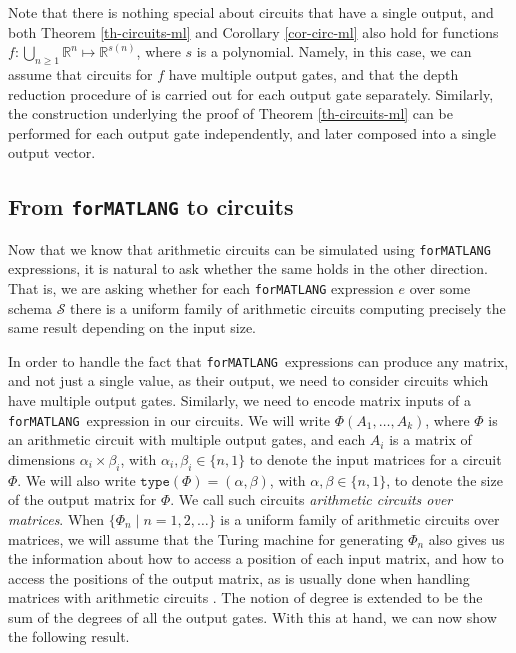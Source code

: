 \documentclass[sigconf]{acmart}
\newcommand{\Sch}{\mathcal{S}}
\newcommand{\langfor}{\texttt{for}\text{-}\texttt{MATLANG}\xspace}
\begin{document}
Note that there is nothing special about circuits that have a single output, and both Theorem \ref{th-circuits-ml} and Corollary \ref{cor-circ-ml} also hold for functions  $f:\bigcup_{n\geq 1} \mathbb{R}^n\mapsto\mathbb{R}^{s(n)}$, where $s$ is a polynomial. Namely, in this case, we can assume that circuits for $f$ have multiple output gates, and that the depth reduction procedure of \cite{AllenderJMV98} is carried out for each output gate separately. Similarly, the construction underlying the proof of Theorem \ref{th-circuits-ml} can be performed for each output gate independently, and later composed into a single output vector.

\subsection{From \langfor to circuits}

Now that we know that arithmetic circuits can be simulated using \langfor expressions, it is natural to ask whether the same holds in the other direction. That is, we are asking whether for each \langfor expression $e$ over some schema $\Sch$ there is a uniform family of arithmetic circuits computing precisely the same result depending on the input size. 

In order to handle the fact that \langfor\ expressions can produce any matrix, and not just a single value, as their output, we need to consider circuits which have multiple output gates. Similarly, we need to encode matrix inputs of a \langfor\ expression in our circuits. We will write $\Phi(A_1,\ldots ,A_k)$, where $\Phi$ is an arithmetic circuit with multiple output gates, and each $A_i$ is a matrix of dimensions $\alpha_i\times \beta_i$, with $\alpha_i,\beta_i \in \{n,1\}$ to denote the input matrices for a circuit $\Phi$. We will also write $\texttt{type}(\Phi)=(\alpha,\beta)$, with $\alpha,\beta\in \{n,1\}$, to denote the size of the output matrix for $\Phi$. We call such circuits \textit{arithmetic circuits over matrices}. When $\{\Phi_n\mid n=1,2,\ldots\}$ is a uniform family of arithmetic circuits over matrices, we will assume that the Turing machine for generating $\Phi_n$ also gives us the information about how to access a position of each input matrix, and how to access the positions of the output matrix, as is usually done when handling matrices with arithmetic circuits \cite{Raz02}. The notion of degree is extended to be the sum of the degrees of all the output gates. With this  at hand, we can now show the following result.
\end{document}
